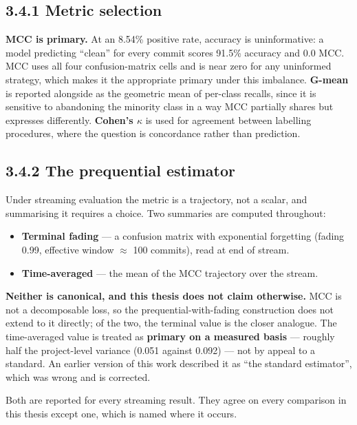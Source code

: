 \subsection{3.4.1 Metric selection}\label{metric-selection}

\textbf{MCC is primary.} At an 8.54\% positive rate, accuracy is
uninformative: a model predicting ``clean'' for every commit scores
91.5\% accuracy and 0.0 MCC. MCC uses all four confusion-matrix cells
and is near zero for any uninformed strategy, which makes it the
appropriate primary under this imbalance. \textbf{G-mean} is reported
alongside as the geometric mean of per-class recalls, since it is
sensitive to abandoning the minority class in a way MCC partially shares
but expresses differently. \textbf{Cohen's \ensuremath{\kappa}} is used for agreement
between labelling procedures, where the question is concordance rather
than prediction.

\subsection{3.4.2 The prequential
estimator}\label{the-prequential-estimator}

Under streaming evaluation the metric is a trajectory, not a scalar, and
summarising it requires a choice. Two summaries are computed throughout:

\begin{itemize}
\tightlist
\item
  \textbf{Terminal fading} --- a confusion matrix with exponential
  forgetting (fading 0.99, effective window \ensuremath{\approx} 100 commits), read at end
  of stream.
\item
  \textbf{Time-averaged} --- the mean of the MCC trajectory over the
  stream.
\end{itemize}

\textbf{Neither is canonical, and this thesis does not claim otherwise.}
MCC is not a decomposable loss, so the prequential-with-fading
construction does not extend to it directly; of the two, the terminal
value is the closer analogue. The time-averaged value is treated as
\textbf{primary on a measured basis} --- roughly half the project-level
variance (0.051 against 0.092) --- not by appeal to a standard. An
earlier version of this work described it as ``the standard estimator'',
which was wrong and is corrected.

Both are reported for every streaming result. They agree on every
comparison in this thesis except one, which is named where it occurs.

